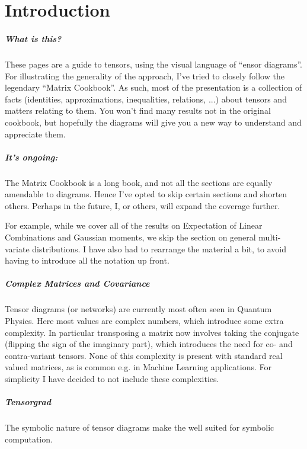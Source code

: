 
\chapter{Introduction}
\paragraph{What is this?}
These pages are a guide to tensors, using the visual language of ``ensor diagrams''.
For illustrating the generality of the approach, I've tried to closely follow the legendary ``Matrix Cookbook''.
As such, most of the presentation is a collection of facts (identities, approximations, inequalities, relations, ...) about tensors and matters relating to them.
You won't find many results not in the original cookbook, but hopefully the diagrams will give you a new way to understand and appreciate them.

\paragraph{It's ongoing:}
The Matrix Cookbook is a long book, and not all the sections are equally amendable to diagrams.
Hence I've opted to skip certain sections and shorten others.
Perhaps in the future, I, or others, will expand the coverage further.

For example, while we cover all of the results on Expectation of Linear Combinations and Gaussian moments, we skip the section on general multi-variate distributions.
I have also had to rearrange the material a bit, to avoid having to introduce all the notation up front.

\paragraph{Complex Matrices and Covariance}
Tensor diagrams (or networks) are currently most often seen in Quantum Physics.
Here most values are complex numbers, which introduce some extra complexity.
In particular transposing a matrix now involves taking the conjugate (flipping the sign of the imaginary part), which introduces the need for co- and contra-variant tensors.
None of this complexity is present with standard real valued matrices, as is common e.g. in Machine Learning applications.
For simplicity I have decided to not include these complexities.

\paragraph{Tensorgrad}
The symbolic nature of tensor diagrams make the well suited for symbolic computation.

